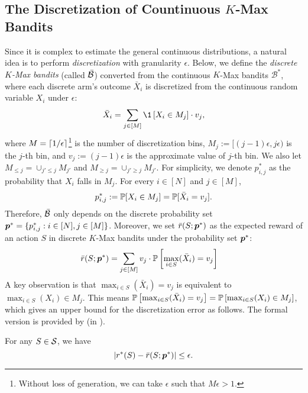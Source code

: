 \subsection{The Discretization of Countinuous $K$-Max Bandits}
\label{sec:discretized-K-Max}
Since it is complex to estimate the general continuous distributions, a natural idea is to perform \textit{discretization} with granularity $\epsilon$.
Below, we define the \textit{discrete $K$-Max bandits} (called $\bar{{\mathcal{B}}}$) converted from the continuous $K$-Max bandits $\mathcal{B}^*$, where each discrete arm's outcome $\bar X_i$ is discretized from the continuous random variable $X_i$ under $\epsilon$:
\begin{align}\label{eq:discretize-outcome}
    \bar X_i = \sum_{j \in [M]} \1\left[X_i \in M_j\right] \cdot v_j,
\end{align}
where $M = \lceil 1/\epsilon \rceil$\footnote{Without loss of generation, we can take $\epsilon$ such that $M\epsilon > 1$.} is the number of discretization bins, $M_j := [(j-1)\epsilon, j\epsilon)$ is the $j$-th bin, and $v_j := (j-1)\epsilon$ is the approximate value of $j$-th bin. 
%
We also let $M_{\le j} = \cup_{j' \le j} M_{j'}$ and $M_{\ge j} = \cup_{j' \ge j} M_{j'}$.
%
For simplicity, we denote $p^*_{i,j}$ as the probability that $X_i$ falls in $M_j$. For every $i \in [N]$ and $j \in [M]$,
\begin{align*}
    p^*_{i,j} := {\mathbb{P}}[X_i \in M_j] = {\mathbb{P}}[\bar X_i = v_j].
\end{align*}
Therefore, $\bar {{\mathcal{B}}}$ only depends on the discrete probability set ${\bm{p}}^* = \{p_{i,j}^* : i \in [N], j \in [M]\}$. Moreover, we set $\bar r(S; {\bm{p}}^*)$ as the expected reward of an action $S$ in discrete $K$-Max bandits under the probability set ${\bm{p}}^*$:
\begin{align*}
    \bar r(S ; {\bm{p}}^*) &= \sum_{j\in [M]} v_j \cdot {\mathbb{P}}\left[\max_{i\in S} (\bar X_i) = v_j\right]
\end{align*}
A key observation is that $\max_{i\in S} (\bar X_i) = v_j$ is equivalent to $\max_{i\in S} (X_i)\in M_j$. This means ${\mathbb{P}}\left[\max_{i\in S} (\bar X_i) = v_j\right] = {\mathbb{P}}\left[\max_{i\in S} (X_i)\in M_j\right]$, which gives an upper bound for the discretization error as follows. The formal version is provided by  (in ). 
\begin{lemma}\label{lemma:discrete-error}
For any $S \in {\mathcal{S}}$, we have
$$|r^*(S) - \bar r(S; {\bm{p}}^*)| \le \epsilon.$$ %
\end{lemma} 





